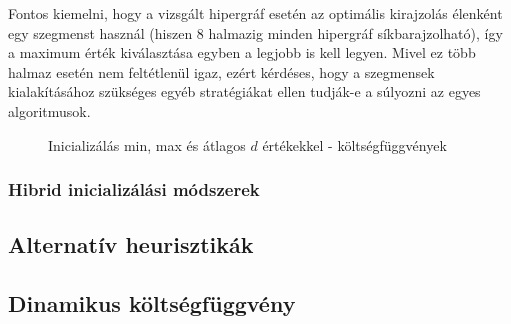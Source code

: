 Fontos kiemelni, hogy a vizsgált hipergráf esetén az optimális kirajzolás élenként egy szegmenst használ (hiszen 8 halmazig minden hipergráf síkbarajzolható), így a maximum érték kiválasztása egyben a legjobb is kell legyen. Mivel ez több halmaz esetén nem feltétlenül igaz, ezért kérdéses, hogy a szegmensek kialakításához szükséges egyéb stratégiákat ellen tudják-e a súlyozni az egyes algoritmusok.

\begin{figure}[H]
	\centering
	\hspace{5pt}
	\hspace{5pt}
	\hspace{5pt}
	\hspace{5pt}
	\hspace{5pt}
	\hspace{5pt}
	\caption{Inicializálás min, max és átlagos $d$ értékekkel - költségfüggvények}
\end{figure}


\subsubsection{Hibrid inicializálási módszerek}

\subsection{Alternatív heurisztikák}


\subsection{Dinamikus költségfüggvény}



